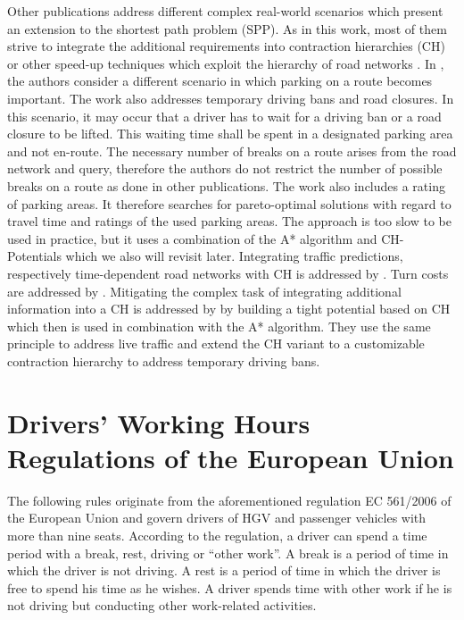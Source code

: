Other publications address different complex real-world scenarios which present an extension to the shortest path problem (SPP). As in this work, most of them strive to integrate the additional requirements into contraction hierarchies (CH) or other speed-up techniques which exploit the hierarchy of road networks \cite{bast:2016}. In \cite{kleff:2020b}, the authors consider a different scenario in which parking on a route becomes important. The work also addresses temporary driving bans and road closures. In this scenario, it may occur that a driver has to wait for a driving ban or a road closure to be lifted. This waiting time shall be spent in a designated parking area and not en-route. The necessary number of breaks on a route arises from the road network and query, therefore the authors do not restrict the number of possible breaks on a route as done in other publications. The work also includes a rating of parking areas. It therefore searches for pareto-optimal solutions with regard to travel time and ratings of the used parking areas. The approach is too slow to be used in practice, but it uses a combination of the A* algorithm and CH-Potentials which we also will revisit later. Integrating traffic predictions, respectively time-dependent road networks with CH is addressed by \cite{batz:2010,batz:2013}. Turn costs are addressed by \cite{geisberger:2011}. Mitigating the complex task of integrating additional information into a CH is addressed by \cite{strasser:2021b} by building a tight potential based on CH which then is used in combination with the A* algorithm. They use the same principle to address live traffic and extend the CH variant to a customizable contraction hierarchy \cite{dibbelt:2016} to address temporary driving bans.


\section{Drivers' Working Hours Regulations of the European Union\label{sec:dwh_eu}}
The following rules originate from the aforementioned regulation EC 561/2006 of the European Union \cite{europeanparliament:2006} and govern drivers of HGV and passenger vehicles with more than nine seats. According to the regulation, a driver can spend a time period with a break, rest, driving or ``other work''. A break is a period of time in which the driver is not driving. A rest is a period of time in which the driver is free to spend his time as he wishes. A driver spends time with other work if he is not driving but conducting other work-related activities.

